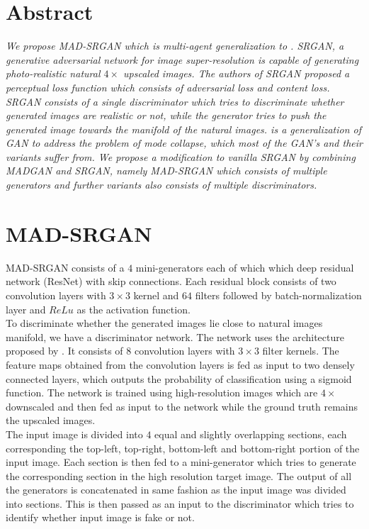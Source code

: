 \documentclass[12pt,a4paper,twocolumn]{article}
\begin{document}
    \section{Abstract}
   {\it We propose MAD-SRGAN which is multi-agent generalization to \cite{SRGAN}. SRGAN, a generative adversarial network for image super-resolution is capable of generating photo-realistic natural $4\times$ upscaled images. The authors of SRGAN proposed a perceptual loss function which consists of adversarial loss and content loss.\\

    SRGAN consists of a single discriminator which tries to discriminate whether generated images are realistic or not, while the generator tries to push the generated image towards the manifold of the natural images. \cite{MADGAN} is a generalization of GAN to address the problem of mode collapse, which most of the GAN's and their variants suffer from. We propose a modification to vanilla SRGAN by combining MADGAN and SRGAN, namely MAD-SRGAN which consists of multiple generators and further variants also consists of multiple discriminators. }  
    
    \section{MAD-SRGAN}
    MAD-SRGAN consists of a $4$ mini-generators each of which which deep residual network (ResNet) with skip connections. Each residual block consists of  two convolution layers with $3\times3$ kernel and $64$ filters followed by batch-normalization layer and $ReLu$ as the activation function.\\
    
     To discriminate whether the generated images lie close to natural images manifold, we have a discriminator network. The network uses the architecture proposed by \cite{Radford et al}. It consists of $8$ convolution layers with $3\times3$ filter kernels. The feature maps obtained from the convolution layers is fed as input to two densely connected layers, which outputs the probability of classification using a sigmoid function. The network is trained using high-resolution images which are $4\times$ downscaled and then fed as input to the network while the ground truth remains the upscaled images. \\
     
        The input image is divided into $4$ equal and slightly overlapping sections, each corresponding the top-left, top-right, bottom-left and bottom-right portion of the input image. Each section is then fed to a mini-generator which tries to generate the corresponding section in the high resolution target image. The output of all the generators is concatenated in same fashion as the input image was divided into sections. This is then passed as an input to the discriminator which tries to identify whether input image is fake or not. \\
         
\end{document}
